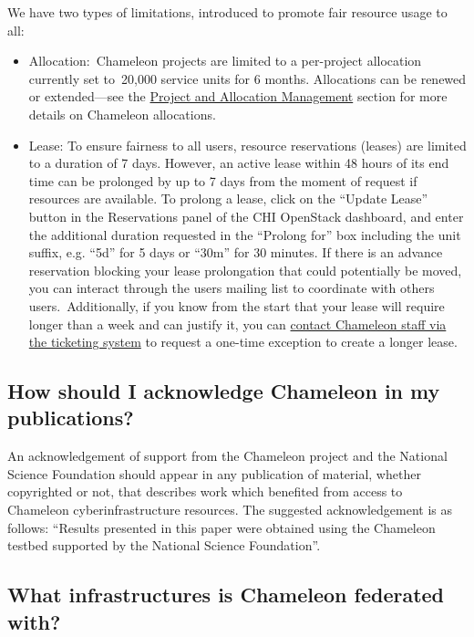 We have two types of limitations, introduced to promote fair resource
usage to all:~

\begin{itemize}
\tightlist
\item
  Allocation:~Chameleon projects are limited to a per-project allocation
  currently set to~20,000 service units for 6 months. Allocations can be
  renewed or extended---see the
  \href{index.html\#toc-project-and-allocation-management}{Project and
  Allocation Management} section for more details on Chameleon
  allocations.
\item
  Lease: To ensure fairness to all users, resource reservations (leases)
  are limited to a duration of 7 days. However, an active lease within
  48 hours of its end time can be prolonged by up to 7 days from the
  moment of request if resources are available. To prolong a lease,
  click on the ``Update Lease'' button in the Reservations panel of the
  CHI OpenStack dashboard, and enter the additional duration requested
  in the ``Prolong for'' box including the unit suffix, e.g. ``5d'' for
  5 days or ``30m'' for 30 minutes. If there is an advance reservation
  blocking your lease prolongation that could potentially be moved, you
  can interact through the users mailing list to coordinate with others
  users.~Additionally, if you know from the start that your lease will
  require longer than a week and can justify it, you can
  \href{https://www.chameleoncloud.org/user/help/ticket/new/}{contact
  Chameleon staff via the ticketing system} to request a one-time
  exception to create a longer lease.
\end{itemize}

\subsection{How should I acknowledge Chameleon in my
publications?}\label{how-should-i-acknowledge-chameleon-in-my-publications}

An acknowledgement of support from the Chameleon project and the
National Science Foundation should appear in any publication of
material, whether copyrighted or not, that describes work which
benefited from access to Chameleon cyberinfrastructure resources. The
suggested acknowledgement is as follows: ``Results presented in this
paper were obtained using the Chameleon testbed supported by the
National Science Foundation''.

\subsection{What infrastructures is Chameleon federated
with?}\label{what-infrastructures-is-chameleon-federated-with}

